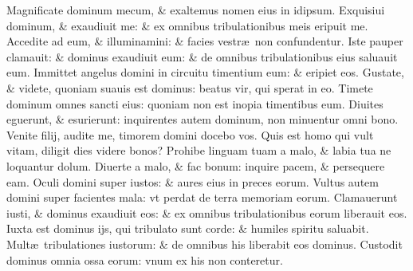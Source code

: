 \documentclass[a5paper,10pt]{book}
\def\ae{æ}
\begin{document}
\begin{multicols*}{2}
\newline \color{red} M\color{black}agnificate dominum mecum, \& exaltemus nomen eius in idipsum.
\newline \color{red} E\color{black}xquisiui dominum, \& exaudiuit me: \& ex omnibus tribulationibus meis eripuit me.
\newline \color{red} A\color{black}ccedite ad eum, \& illuminamini: \& facies vestr\ae \ non confundentur.
\newline \color{red} I\color{black}ste pauper clamauit: \& dominus exaudiuit eum: \& de omnibus tribulationibus eius saluauit eum.
\newline \color{red} I\color{black}mmittet angelus domini in circuitu timentium eum: \& eripiet eos.
\newline \color{red} G\color{black}ustate, \& videte, quoniam suauis est dominus: beatus vir, qui sperat in eo.
\newline \color{red} T\color{black}imete dominum omnes sancti eius: quoniam non est inopia timentibus eum.
\newline \color{red} D\color{black}iuites eguerunt, \& esurierunt: inquirentes autem dominum, non minuentur omni bono.
\newline \color{red} V\color{black}enite filij, audite me, timorem domini docebo vos.
\newline \color{red} Q\color{black}uis est homo qui vult vitam, diligit dies videre bonos?
\newline \color{red} P\color{black}rohibe linguam tuam a malo, \& labia tua ne loquantur dolum.
\newline \color{red} D\color{black}iuerte a malo, \& fac bonum: inquire pacem, \& persequere eam.
\newline \color{red} O\color{black}culi domini super iustos: \& aures eius in preces eorum.
\newline \color{red} V\color{black}ultus autem domini super facientes mala: vt perdat de terra memoriam eorum.
\newline \color{red} C\color{black}lamauerunt iusti, \& dominus exaudiuit eos: \& ex omnibus tribulationibus eorum liberauit eos.
\newline \color{red} I\color{black}uxta est dominus ijs, qui tribulato sunt corde: \& humiles spiritu saluabit.
\newline \color{red} M\color{black}ult\ae \ tribulationes iustorum: \& de omnibus his liberabit eos dominus.
\newline \color{red} C\color{black}ustodit dominus omnia ossa eorum: vnum ex his non conteretur.

\end{multicols*}
\end{document}
